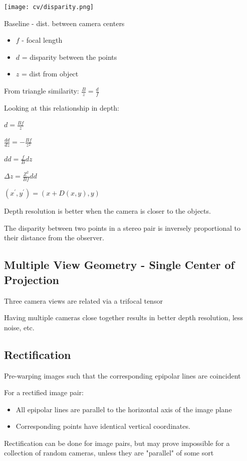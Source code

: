 \texttt{[image: cv/disparity.png]}

Baseline - dist. between camera centers
\begin{itemize}
\item $f$ - focal length
\item $d$ = disparity between the points
\item $z$ = dist from object
\end{itemize}

From triangle similarity: $\frac{B}{z} = \frac{d}{f}$

Looking at this relationship in depth:

${d}=\frac{Bf}{z} $

$\frac{dd}{dz}=-\frac{Bf}{z^2}$

$dd = \frac{f}{B}dz$

$\Delta z = \frac{Z^2}{Bf}dd$

$(x^\prime,y^\prime)=(x+D(x,y),y)$

Depth resolution is better when the camera is closer to the objects.

The disparity between two points in a stereo pair is inversely proportional to their distance from the observer.


\subsection{Multiple View Geometry - Single Center of Projection}

Three camera views are related via a trifocal tensor 

Having multiple cameras close together results in better depth resolution, less noise, etc.

\subsection{Rectification}

Pre-warping images such that the corresponding epipolar lines are coincident

For a rectified image pair:

\begin{itemize}
\item All epipolar lines are parallel to the horizontal axis of the image plane
\item Corresponding points have identical vertical coordinates.
\end{itemize}

Rectification can be done for image pairs, but may prove impossible for a collection of random cameras, unless they are "parallel" of some sort

